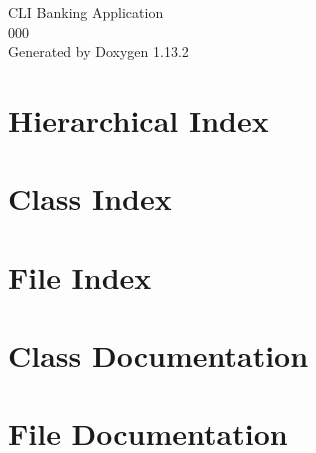 \documentclass[twoside]{book}
\newcommand{\+}{\discretionary{\mbox{\scriptsize$\hookleftarrow$}}{}{}}
\newcommand{\clearemptydoublepage}{%
    \newpage{\pagestyle{empty}\cleardoublepage}%
  }
\begin{document}
  \raggedbottom
    \hypersetup{pageanchor=false,
                bookmarksnumbered=true,
                pdfencoding=unicode
               }
  \begin{titlepage}
  \vspace*{7cm}
  \begin{center}%
  {\Large CLI Banking Application}\\
  [1ex]\large 000 \\
  \vspace*{1cm}
  {\large Generated by Doxygen 1.13.2}\\
  \end{center}
  \end{titlepage}
  \clearemptydoublepage
  \tableofcontents
  \clearemptydoublepage
  \hypersetup{pageanchor=true}
\chapter{Hierarchical Index}

\chapter{Class Index}

\chapter{File Index}

\chapter{Class Documentation}










\chapter{File Documentation}
























  \backmatter
  \newpage
  \clearemptydoublepage
  \printindex
\end{document}
